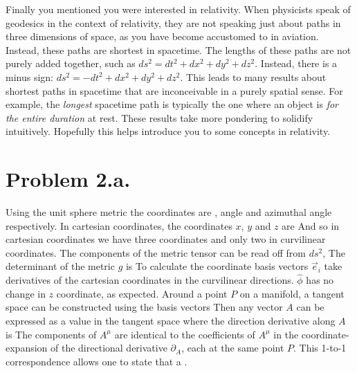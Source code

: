 \documentclass{article}
\begin{document}
Finally you mentioned you were interested in relativity. When physicists speak of geodesics in the context of relativity, they are not speaking just about paths in three dimensions of space, as you have become accustomed to in aviation. Instead, these paths are shortest in spacetime. The lengths of these paths are not purely added together, such as $ds^2=dt^2+dx^2+dy^2+dz^2$. Instead, there is a minus sign: $ds^2=-dt^2+dx^2+dy^2+dz^2$. This leads to many results about shortest paths in spacetime that are inconceivable in a purely spatial sense. For example, the \textit{longest} spacetime path is typically the one where an object is \textit{for the entire duration} at rest. These results take more pondering to solidify intuitively. Hopefully this helps introduce you to some concepts in relativity.
\section*{Problem 2.a.}
Using the unit sphere metric
the coordinates are , angle and azimuthal angle respectively. In cartesian coordinates, the coordinates $x$, $y$ and $z$ are
And so in cartesian coordinates we have three coordinates and only two in curvilinear coordinates. The components of the metric tensor can be read off from $ds^2$,
The determinant of the metric $g$ is
To calculate the coordinate basis vectors $\vec{e}_i$ take derivatives of the cartesian coordinates in the curvilinear directions.
$\hat{\phi}$ has no change in $z$ coordinate, as expected. Around a point $P$ on a manifold, a tangent space can be constructed using the basis vectors
Then any vector $A$ can be expressed as a value in the tangent space
where the direction derivative along $A$ is 
The components of $A^\mu$ are identical to the coefficients of $A^\mu$ in the coordinate-expansion of the directional derivative $\partial_{A}$, each at the same point $P$. This 1-to-1 correspondence allows one to state that a .
\end{document}
